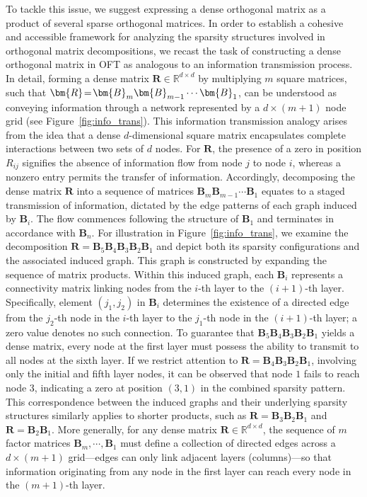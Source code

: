 To tackle this issue, we suggest expressing a dense orthogonal matrix as a product of several sparse orthogonal matrices. In order to establish a cohesive and accessible framework for analyzing the sparsity structures involved in orthogonal matrix decompositions, we recast the task of constructing a dense orthogonal matrix in OFT as analogous to an information transmission process. In detail, forming a dense matrix $\bm{R}\in\mathbb{R}^{d\times d}$ by multiplying $m$ square matrices, such that $\thickmuskip=2mu \medmuskip=2mu \bm{R}=\bm{B}_m\bm{B}_{m-1}\cdots\bm{B}_1$, can be understood as conveying information through a network represented by a $d\times (m+1)$ node grid (see Figure~\ref{fig:info_trans}). This information transmission analogy arises from the idea that a dense $d$-dimensional square matrix encapsulates complete interactions between two sets of $d$ nodes. For $\bm{R}$, the presence of a zero in position $R_{ij}$ signifies the absence of information flow from node $j$ to node $i$, whereas a nonzero entry permits the transfer of information. Accordingly, decomposing the dense matrix $\bm{R}$ into a sequence of matrices $\bm{B}_m\bm{B}_{m-1}\cdots\bm{B}_1$ equates to a staged transmission of information, dictated by the edge patterns of each graph induced by $\bm{B}_i$. The flow commences following the structure of $\bm{B}_1$ and terminates in accordance with $\bm{B}_n$. For illustration in Figure~\ref{fig:info_trans}, we examine the decomposition $\bm{R}=\bm{B}_5\bm{B}_4\bm{B}_3\bm{B}_2\bm{B}_1$ and depict both its sparsity configurations and the associated induced graph. This graph is constructed by expanding the sequence of matrix products. Within this induced graph, each $\bm{B}_i$ represents a connectivity matrix linking nodes from the $i$-th layer to the $(i+1)$-th layer. Specifically, element $(j_1,j_2)$ in $\bm{B}_i$ determines the existence of a directed edge from the $j_2$-th node in the $i$-th layer to the $j_1$-th node in the $(i+1)$-th layer; a zero value denotes no such connection. To guarantee that $\bm{B}_5\bm{B}_4\bm{B}_3\bm{B}_2\bm{B}_1$ yields a dense matrix, every node at the first layer must possess the ability to transmit to all nodes at the sixth layer. If we restrict attention to $\bm{R}=\bm{B}_4\bm{B}_3\bm{B}_2\bm{B}_1$, involving only the initial and fifth layer nodes, it can be observed that node $1$ fails to reach node $3$, indicating a zero at position $(3,1)$ in the combined sparsity pattern. This correspondence between the induced graphs and their underlying sparsity structures similarly applies to shorter products, such as $\bm{R}=\bm{B}_3\bm{B}_2\bm{B}_1$ and $\bm{R}=\bm{B}_2\bm{B}_1$. More generally, for any dense matrix $\bm{R}\in\mathbb{R}^{d\times d}$, the sequence of $m$ factor matrices $\bm{B}_m,\cdots,\bm{B}_1$ must define a collection of directed edges across a $d\times (m+1)$ grid—edges can only link adjacent layers (columns)—so that information originating from any node in the first layer can reach every node in the $(m+1)$-th layer.

